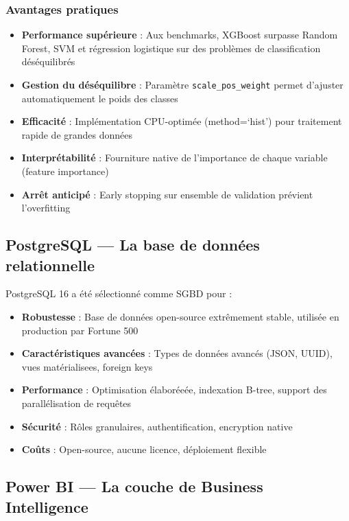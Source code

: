 \documentclass[a4paper,12pt,twoside]{report}
\begin{document}
\subsubsection{Avantages pratiques}

\begin{itemize}
    \item \textbf{Performance supérieure} : Aux benchmarks, XGBoost surpasse Random Forest, SVM et régression logistique sur des problèmes de classification déséquilibrés
    \item \textbf{Gestion du déséquilibre} : Paramètre \texttt{scale\_pos\_weight} permet d'ajuster automatiquement le poids des classes
    \item \textbf{Efficacité} : Implémentation CPU-optimée (method=`hist') pour traitement rapide de grandes données
    \item \textbf{Interprétabilité} : Fourniture native de l'importance de chaque variable (feature importance)
    \item \textbf{Arrêt anticipé} : Early stopping sur ensemble de validation prévient l'overfitting
\end{itemize}

\subsection{PostgreSQL — La base de données relationnelle}

PostgreSQL 16 a été sélectionné comme SGBD pour :

\begin{itemize}
    \item \textbf{Robustesse} : Base de données open-source extrêmement stable, utilisée en production par Fortune 500
    \item \textbf{Caractéristiques avancées} : Types de données avancés (JSON, UUID), vues matérialisees, foreign keys
    \item \textbf{Performance} : Optimisation élaboréeée, indexation B-tree, support des parallélisation de requêtes
    \item \textbf{Sécurité} : Rôles granulaires, authentification, encryption native
    \item \textbf{Coûts} : Open-source, aucune licence, déploiement flexible
\end{itemize}

\subsection{Power BI — La couche de Business Intelligence}
\end{document}
